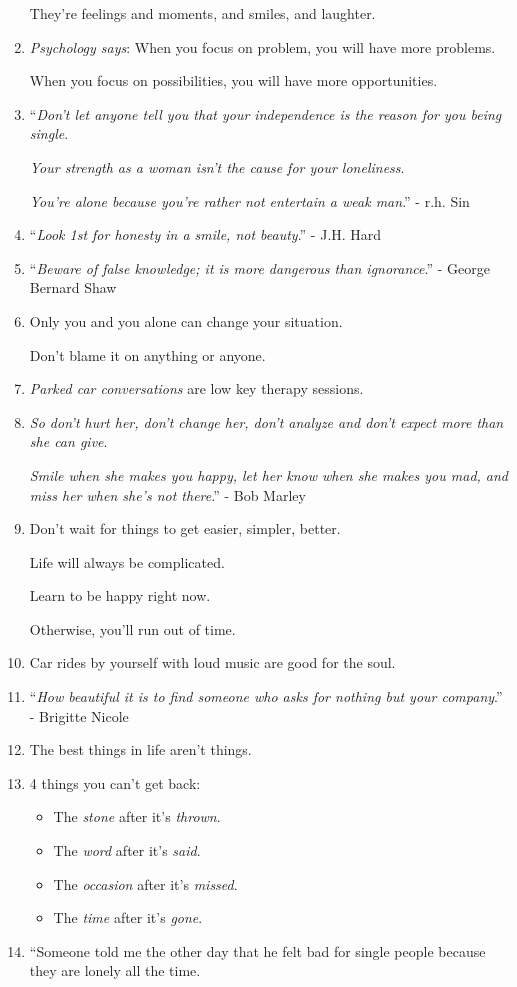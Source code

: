 \documentclass{article}
\begin{document}
\begin{enumerate}
	They're feelings and moments, and smiles, and laughter.
	\item \textit{Psychology says}: When you focus on problem, you will have more problems.
	
	When you focus on possibilities, you will have more opportunities.
	\item ``\textit{Don't let anyone tell you that your independence is the reason for you being single}.
	
	\textit{Your strength as a woman isn't the cause for your loneliness}.
	
	\textit{You're alone because you're rather not entertain a weak man}.'' - r.h. Sin
	\item ``\textit{Look 1st for honesty in a smile, not beauty}.'' - J.H. Hard
	\item ``\textit{Beware of false knowledge; it is more dangerous than ignorance}.'' - George Bernard Shaw
	\item Only you and you alone can change your situation.
	
	Don't blame it on anything or anyone.
	\item \textit{Parked car conversations} are low key therapy sessions.
	\item \textit{So don't hurt her, don't change her, don't analyze and don't expect more than she can give}.
	
	\textit{Smile when she makes you happy, let her know when she makes you mad, and miss her when she's not there}.'' - Bob Marley
	\item Don't wait for things to get easier, simpler, better.
	
	Life will always be complicated.
	
	Learn to be happy right now.
	
	Otherwise, you'll run out of time.
	\item Car rides by yourself with loud music are good for the soul.
	\item ``\textit{How beautiful it is to find someone who asks for nothing but your company}.'' - Brigitte Nicole
	\item The best things in life aren't things.
	\item 4 things you can't get back:
	\begin{itemize}
		\item The \textit{stone} after it's \textit{thrown}.
		\item The \textit{word} after it's \textit{said}.
		\item The \textit{occasion} after it's \textit{missed}.
		\item The \textit{time} after it's \textit{gone}.
	\end{itemize}
	\item ``Someone told me the other day that he felt bad for single people because they are lonely all the time.
	

\end{enumerate}
\end{document}
